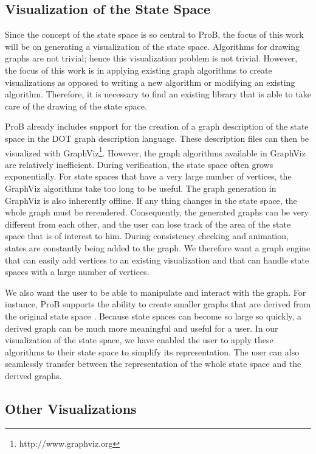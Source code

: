 \subsection{Visualization of the State Space}

Since the concept of the state space is so central to ProB, the focus of this work will be on generating a visualization of the state space. Algorithms for drawing graphs are not trivial; hence this visualization problem is not trivial. However, the focus of this work is in applying existing graph algorithms to create visualizations as opposed to writing a new algorithm or modifying an existing algorithm. Therefore, it is necessary to find an existing library that is able to take care of the drawing of the state space.

ProB already includes support for the creation of a graph description of the state space in the DOT graph description language. These description files can then be visualized with GraphViz\footnote{http://www.graphviz.org}. However, the graph algorithms available in GraphViz are relatively inefficient. During verification, the state space often grows exponentially. For state spaces that have a very large number of vertices, the GraphViz algorithms take too long to be useful. The graph generation in GraphViz is also inherently offline. If any thing changes in the state space, the whole graph must be rerendered. Consequently, the generated graphs can be very different from each other, and the user can lose track of the area of the state space that is of interest to him. During consistency checking and animation, states are constantly being added to the graph. We therefore want a graph engine that can easily add vertices to an existing visualization and that can handle state spaces with a large number of vertices.

We also want the user to be able to manipulate and interact with the graph. For instance, ProB supports the ability to create smaller graphs that are derived from the original state space \cite{LeTu05_8}. Because state spaces can become so large so quickly, a derived graph can be much more meaningful and useful for a user. In our visualization of the state space, we have enabled the user to apply these algorithms to their state space to simplify its representation. The user can also seamlessly transfer between the representation of the whole state space and the derived graphs.

\subsection{Other Visualizations}

